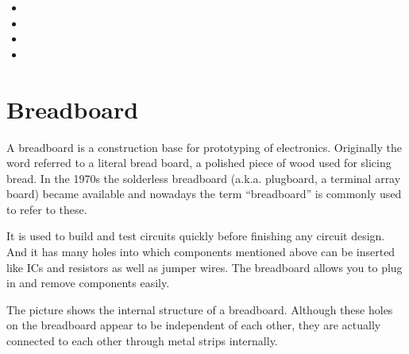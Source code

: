 \documentclass[a4paper,11pt,english]{sphinxmanual}
\let\sphinxpxdimen\pdfpxdimen\else\newdimen\sphinxpxdimen
\begin{document}
\sphinxAtStartPar
{}

\noindent{}
\begin{itemize}
\item {} 
\sphinxAtStartPar
{}

\item {} 
\sphinxAtStartPar
{}

\item {} 
\sphinxAtStartPar
{}

\item {} 
\sphinxAtStartPar
{}

\end{itemize}

\sphinxstepscope


\section{Breadboard}
\label{\detokenize{Components_Kit/component_breadboard:breadboard}}\label{\detokenize{Components_Kit/component_breadboard:cpn-breadboard}}\label{\detokenize{Components_Kit/component_breadboard::doc}}
\noindent\sphinxincludegraphics[width=600\sphinxpxdimen]{{breadboard}.png}

\sphinxAtStartPar
A breadboard is a construction base for prototyping of electronics. Originally the word referred to a literal bread board, a polished piece of wood used for slicing bread. In the 1970s the solderless breadboard (a.k.a. plugboard, a terminal array board) became available and nowadays the term “breadboard” is commonly used to refer to these.

\sphinxAtStartPar
It is used to build and test circuits quickly before finishing any circuit design.
And it has many holes into which components mentioned above can be inserted like ICs and resistors as well as jumper wires.
The breadboard allows you to plug in and remove components easily.

\sphinxAtStartPar
The picture shows the internal structure of a breadboard.
Although these holes on the breadboard appear to be independent of each other, they are actually connected to each other through metal strips internally.
\end{document}
